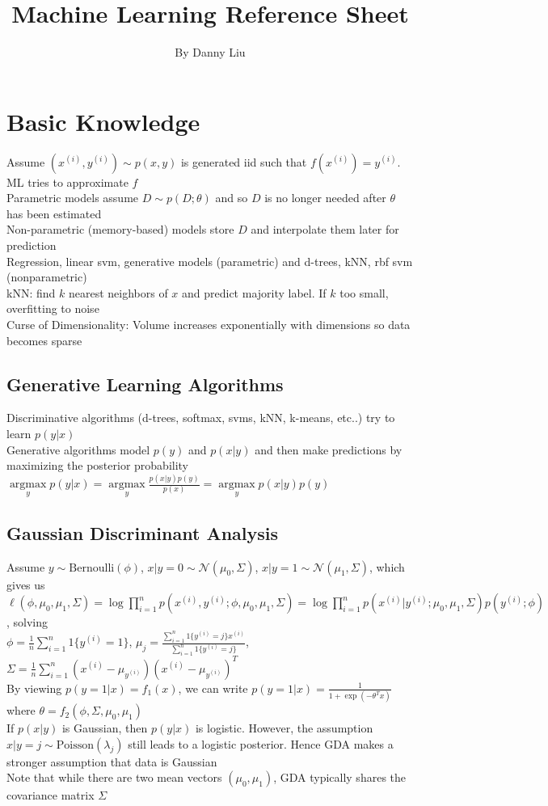 \documentclass{article}
\title{Machine Learning Reference Sheet}
\author{By Danny Liu}
\date{}
\DeclareMathOperator*{\argmax}{argmax}
\begin{document}
\maketitle

\section{Basic Knowledge}
Assume $(x^{(i)}, y^{(i)}) \sim p(x,y)$ is generated iid such that $f(x^{(i)}) = y^{(i)}$. ML tries to approximate $f$ \\
Parametric models assume $D \sim p(D; \theta)$ and so $D$ is no longer needed after $\theta$ has been estimated \\
Non-parametric (memory-based) models store $D$ and interpolate them later for prediction \\
Regression, linear svm, generative models (parametric) and d-trees, kNN, rbf svm (nonparametric) \\
kNN: find $k$ nearest neighbors of $x$ and predict majority label. If $k$ too small, overfitting to noise \\
Curse of Dimensionality: Volume increases exponentially with dimensions so data becomes sparse 

\subsection{Generative Learning Algorithms}
Discriminative algorithms (d-trees, softmax, svms, kNN, k-means, etc..) try to learn $p(y|x)$ \\
Generative algorithms model $p(y)$ and $p(x|y)$ and then make predictions by maximizing the posterior probability $\argmax\limits_y p(y|x) = \argmax\limits_y \frac{p(x|y)p(y)}{p(x)} = \argmax\limits_y p(x|y)p(y)$ 

\subsection{Gaussian Discriminant Analysis}
Assume $y \sim \mbox{Bernoulli}(\phi)$, $x|y=0 \sim \mathcal{N}(\mu_0, \Sigma)$, $x|y=1 \sim \mathcal{N}(\mu_1, \Sigma)$, which gives us \\
$\ell(\phi, \mu_0, \mu_1, \Sigma) = \log \prod\limits_{i=1}^np(x^{(i)}, y^{(i)}; \phi, \mu_0, \mu_1, \Sigma) = \log \prod\limits_{i=1}^np(x^{(i)} | y^{(i)}; \mu_0, \mu_1, \Sigma)p(y^{(i)}; \phi)$, solving \\
$\phi = \frac{1}{n}\sum\limits_{i=1}^n 1\{y^{(i)} = 1\}$, $\mu_j = \frac{\sum_{i=1}^n 1\{y^{(i)} = j\} x^{(i)}} {\sum_{i=1}^n 1\{y^{(i)} = j\}}$, $\Sigma = \frac{1}{n}\sum\limits_{i=1}^n (x^{(i)} - \mu_{y^{(i)}})(x^{(i)} - \mu_{y^{(i)}})^T$ \\
By viewing $p(y=1|x) = f_1(x)$, we can write $p(y=1|x) = \frac{1}{1+\exp(-\theta^Tx)}$ where $\theta = f_2(\phi, \Sigma, \mu_0, \mu_1)$ \\
If $p(x|y)$ is Gaussian, then $p(y|x)$ is logistic. However, the assumption  $x|y = j \sim \mbox{Poisson}(\lambda_j)$ still leads to a logistic posterior. Hence GDA makes a stronger assumption that data is Gaussian \\
Note that while there are two mean vectors $(\mu_0, \mu_1)$, GDA typically shares the covariance matrix $\Sigma$
\end{document}
